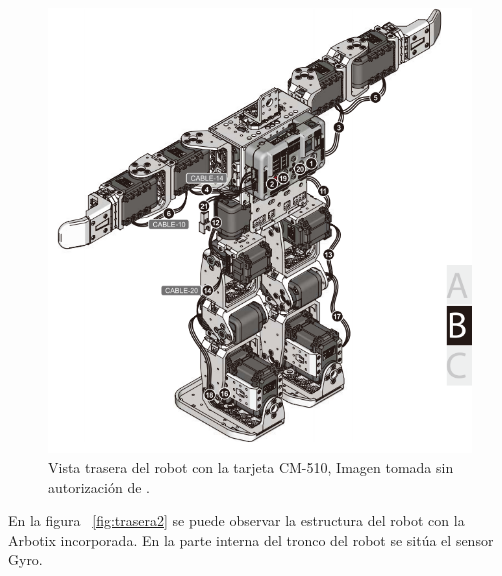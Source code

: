 \begin{figure}[hbtp]
\centering
\includegraphics[scale=0.3]{imagenes/RobotTrasero.png}
\caption{Vista trasera del robot con la tarjeta CM-510, Imagen tomada sin autorizaci\'on de \cite{manualRobot}.}
\label{fig:trasera1}
\end{figure}


En la figura ~\ref{fig:trasera2} se puede observar la estructura del robot con la Arbotix incorporada. En la parte interna del tronco del robot se sitúa el sensor Gyro.

